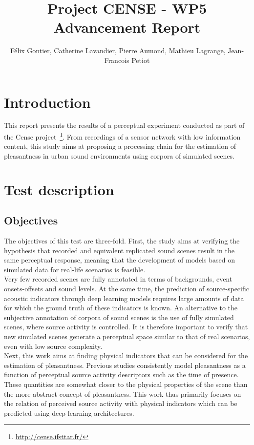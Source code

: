 \documentclass[11pt,a4paper]{article}
\begin{document}
\author{F\'elix Gontier, Catherine Lavandier, Pierre Aumond, Mathieu Lagrange, Jean-Francois Petiot}
\title{Project CENSE - WP5 Advancement Report}
\maketitle

\section{Introduction}

This report presents the results of a perceptual experiment conducted as part of the Cense project~\footnote{\url{http://cense.ifsttar.fr/}}. From recordings of a sensor network with low information content, this study aims at proposing a processing chain for the estimation of pleasantness in urban sound environments using corpora of simulated scenes.\\

\section{Test description}
\label{sec:test}
\subsection{Objectives}
\label{sec:test_obj}

The objectives of this test are three-fold. First, the study aims at verifying the hypothesis that recorded and equivalent replicated sound scenes result in the same perceptual response, meaning that the development of models based on simulated data for real-life scenarios is feasible.\\

Very few recorded scenes are fully annotated in terms of backgrounds, event onsets-offsets and sound levels. At the same time, the prediction of source-specific acoustic indicators through deep learning models requires large amounts of data for which the ground truth of these indicators is known. An alternative to the subjective annotation of corpora of sound scenes is the use of fully simulated scenes, where source activity is controlled. It is therefore important to verify that new simulated scenes generate a perceptual space similar to that of real scenarios, even with low source complexity.\\

Next, this work aims at finding physical indicators that can be considered for the estimation of pleasantness. Previous studies consistently model pleasantness as a function of perceptual source activity descriptors such as the time of presence. These quantities are somewhat closer to the physical properties of the scene than the more abstract concept of pleasantness. This work thus primarily focuses on the relation of perceived source activity with physical indicators which can be predicted using deep learning architectures.
\end{document}
